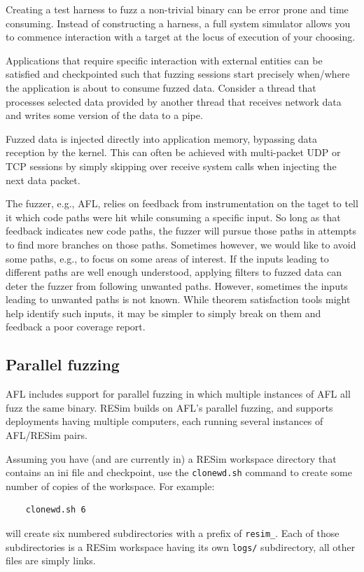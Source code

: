 \documentclass[titlepage]{article}
\begin{document}
Creating a test harness to fuzz a non-trivial binary can be error prone and time consuming.
Instead of constructing a harness, a full system simulator allows you to commence interaction
with a target at the locus of execution of your choosing.

Applications that require specific interaction with external entities can be satisfied and checkpointed
such that fuzzing sessions start precisely when/where the application is about to consume fuzzed data.
Consider a thread that processes selected data provided by another thread that receives network data
and writes some version of the data to a pipe.

Fuzzed data is injected directly into application memory, bypassing data reception by the kernel.
This can often be achieved with multi-packet UDP or TCP sessions by simply skipping over receive system
calls when injecting the next data packet.

The fuzzer, e.g., AFL, relies on feedback from instrumentation on the taget to tell it which code paths
were hit while consuming a specific input.  So long as that feedback indicates new code paths, the fuzzer
will pursue those paths in attempts to find more branches on those paths.  Sometimes however, we would like
to avoid some paths, e.g., to focus on some areas of interest.  If the inputs leading to different paths
are well enough understood, applying filters to fuzzed data can deter the fuzzer from following unwanted paths.
However, sometimes the inputs leading to unwanted paths is not known.  While theorem satisfaction tools might
help identify such inputs, it may be simpler to simply break on them and feedback a poor coverage report.

\subsection{Parallel fuzzing}
\label{parallel-fuzzing}
AFL includes support for parallel fuzzing in which multiple instances of AFL all fuzz the same binary.
RESim builds on AFL's parallel fuzzing, and supports deployments having multiple computers, each running
several instances of AFL/RESim pairs.

Assuming you have (and are currently in) a RESim workspace directory that contains an ini file and checkpoint, use the {\tt clonewd.sh}
command to create some number of copies of the workspace.  For example:
\begin{verbatim}
    clonewd.sh 6
\end{verbatim}
\noindent will create six numbered subdirectories with a prefix of {\tt resim\_}.  Each of those subdirectories is a RESim workspace
having its own {\tt logs/} subdirectory,  all other files are simply links.
\end{document}
